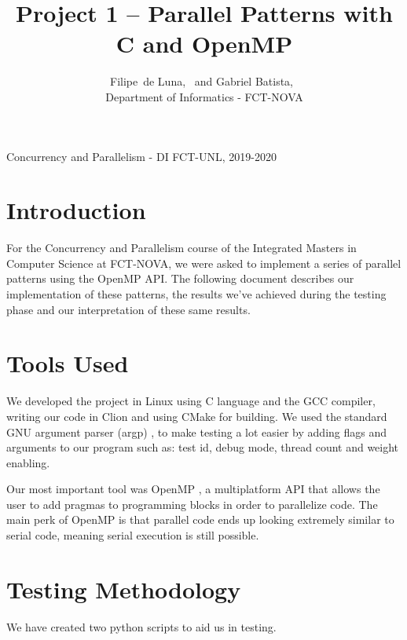 \documentclass[9pt,journal]{IEEEtran}
\begin{document}

\title{Project 1 -- Parallel Patterns with C and OpenMP}


\author{
	{
		Filipe~de Luna,~ and
        Gabriel Batista,~
    } \\ Department of Informatics - FCT-NOVA
        
}

%
{Concurrency and Parallelism - DI FCT-UNL, 2019-2020}

\maketitle

\section{Introduction}
For the Concurrency and Parallelism course of the Integrated Masters in Computer Science at FCT-NOVA, we were asked to implement a series of parallel patterns using the OpenMP API. The following document describes our implementation of these patterns, the results we’ve achieved during the testing phase and our interpretation of these same results.

\section{Tools Used}

We developed the project in Linux using C language and the GCC compiler, writing our code in Clion and using CMake for building. We used the standard GNU argument parser (argp) \cite{argp}, to make testing a lot easier by adding flags and arguments to our program such as: test id, debug mode, thread count and weight enabling.

Our most important tool was OpenMP \cite{omp}, a multiplatform API that allows the user to add pragmas to programming blocks in order to parallelize code. The main perk of OpenMP is that parallel code ends up looking extremely similar to serial code, meaning serial execution is still possible.

\section{Testing Methodology}

We have created two python scripts to aid us in testing.
\end{document}
